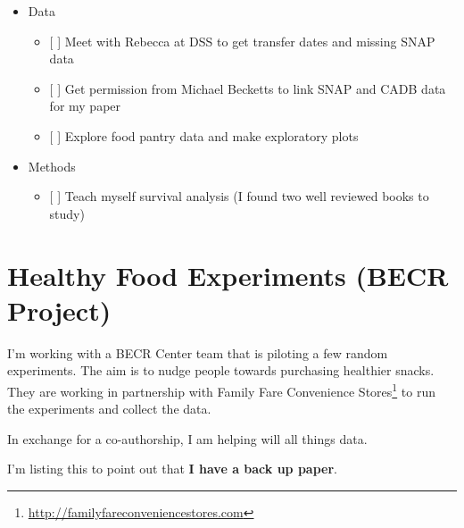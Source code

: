 \documentclass[12pt,letterpaperpaper,]{book}
\providecommand{\tightlist}{%
  \setlength{\itemsep}{0pt}\setlength{\parskip}{0pt}}
\renewcommand{\href}[2]{#2\footnote{\url{#1}}}
\begin{document}
\begin{itemize}
\tightlist
\item
  Data

  \begin{itemize}
  \tightlist
  \item
    {[} {]} Meet with Rebecca at DSS to get transfer dates and missing
    SNAP data
  \item
    {[} {]} Get permission from Michael Becketts to link SNAP and CADB
    data for my paper
  \item
    {[} {]} Explore food pantry data and make exploratory plots
  \end{itemize}
\item
  Methods

  \begin{itemize}
  \tightlist
  \item
    {[} {]} Teach myself survival analysis (I found two well reviewed
    books to study)
  \end{itemize}
\end{itemize}

\chapter{Healthy Food Experiments (BECR
Project)}\label{healthy-food-experiments-becr-project}

I'm working with a BECR Center team that is piloting a few random
experiments. The aim is to nudge people towards purchasing healthier
snacks. They are working in partnership with
\href{http://familyfareconveniencestores.com}{Family Fare Convenience
Stores} to run the experiments and collect the data.

In exchange for a co-authorship, I am helping will all things data.

I'm listing this to point out that \textbf{I have a back up paper}.



\backmatter
\printindex
\end{document}
